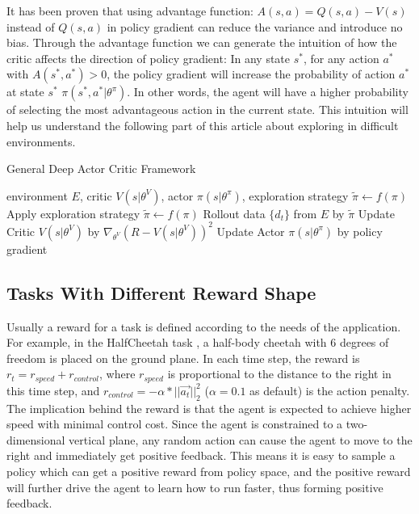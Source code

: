It has been proven that using advantage function: $A(s,a)=Q(s,a)-V(s)$ instead of $Q(s,a)$ in policy gradient can reduce the variance and introduce no bias. Through the advantage function we can generate the intuition of how the critic affects the direction of policy gradient: In any state $s^*$, for any action $a^*$ with $A(s^*,a^*) > 0$, the policy gradient will increase the probability of action $a^*$ at state $s^*$ $\pi(s^*,a^*|\theta^{\pi})$. In other words, the agent will have a higher probability of selecting the most advantageous action in the current state. This intuition will help us understand the following part of this article about exploring in difficult environments.

\begin{algorithm}[htbp]
    \caption{General Deep Actor Critic Framework}
    \label{alg:gac}
 \begin{algorithmic}
     environment $E$, critic $V(s|\theta^V)$, actor $\pi(s|\theta^\pi)$, exploration strategy $\tilde\pi \leftarrow f(\pi)$
    \STATE Apply exploration strategy $\tilde\pi \leftarrow f(\pi)$
    \STATE Rollout data $\{d_t\}$ from $E$ by $\tilde\pi$
    \STATE Update Critic $V(s|\theta^V)$ by $\nabla_{\theta^V}(R-V(s|\theta^V))^2$
    \STATE Update Actor $\pi(s|\theta^\pi)$ by policy gradient 
    \ENDFOR
    \ENDFOR
 \end{algorithmic}
 \end{algorithm}



\subsection{Tasks With Different Reward Shape}
\label{sec:tasks}
Usually a reward for a task is defined according to the needs of the application. For example, in the HalfCheetah task \cite{mujoco}, a half-body cheetah with 6 degrees of freedom is placed on the ground plane. In each time step, the reward is $r_t = r_{speed} + r_{control}$, where $r_{speed}$ is proportional to the distance to the right in this time step, and $r_{control} = -\alpha*||\vec{a_t}||^2_2$ ($\alpha = 0.1$ as default) is the action penalty. The implication behind the reward is that the agent is expected to achieve higher speed with minimal control cost. Since the agent is constrained to a two-dimensional vertical plane, any random action can cause the agent to move to the right and immediately get positive feedback. This means it is easy to sample a policy which can get a positive reward from policy space, and the positive reward will further drive the agent to learn how to run faster, thus forming positive feedback.


